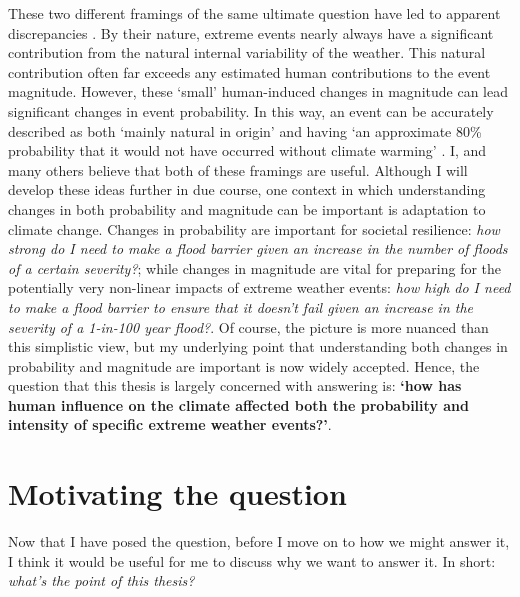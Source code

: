   These two different framings of the same ultimate question have led to apparent discrepancies \citep{otto_reconciling_2012}. By their nature, extreme events nearly always have a significant contribution from the natural internal variability of the weather. This natural contribution often far exceeds any estimated human contributions to the event magnitude. However, these `small' human-induced changes in magnitude can lead significant changes in event probability. In this way, an event can be accurately described as both `mainly natural in origin' \citep{dole_was_2011} and having `an approximate 80\% probability that it would not have occurred without climate warming' \citep{rahmstorf_increase_2011}. I, and many others \citep{stott_attribution_2013,stott_attribution_2016,otto_attribution_2016,swain_attributing_2020,easterling_detection_2016,national_academies_of_sciences_engineering_and_medicine_attribution_2016} believe that both of these framings are useful. Although I will develop these ideas further in due course, one context in which understanding changes in both probability and magnitude can be important is adaptation to climate change. Changes in probability are important for societal resilience: \emph{how strong do I need to make a flood barrier given an increase in the number of floods of a certain severity?}; while changes in magnitude are vital for preparing for the potentially very non-linear impacts of extreme weather events: \emph{how high do I need to make a flood barrier to ensure that it doesn't fail given an increase in the severity of a 1-in-100 year flood?}. Of course, the picture is more nuanced than this simplistic view, but my underlying point that understanding both changes in probability and magnitude are important is now widely accepted. Hence, the question that this thesis is largely concerned with answering is: \textbf{`how has human influence on the climate affected both the probability and intensity of specific extreme weather events?'}.


\section{Motivating the question}\label{intro:motivation}

  Now that I have posed the question, before I move on to how we might answer it, I think it would be useful for me to discuss why we want to answer it. In short: \emph{what's the point of this thesis?}

